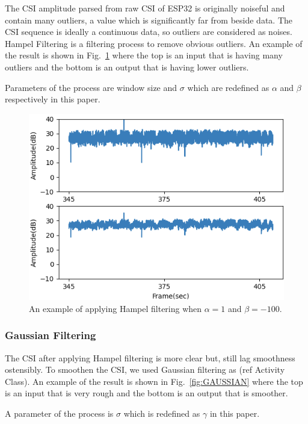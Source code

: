 \documentclass[10pt,letterpaper]{article}
\begin{document}
	The CSI amplitude parsed from raw CSI of ESP32 is originally noiseful and contain many outliers, a value which is significantly far from beside data. The CSI sequence is ideally a continuous data, so outliers are considered as noises.  Hampel Filtering is a filtering process to remove obvious outliers. An example of the result is shown in  Fig.~\ref{fig:HAMPEL} where the top is an input that is having many outliers and the bottom is an output that is having lower outliers.
	
		Parameters of the process are window size and $\sigma$ which are redefined as $\alpha$ and $\beta$ respectively in this paper.
		
		\begin{figure}[htbp]
		\centerline{\includegraphics[width=120mm,scale=0.9]{FILPD_R2H.png}}
		\caption{An example of applying Hampel filtering when $\alpha=1$ and $\beta=-100$.}
		\label{fig:HAMPEL}
	\end{figure}

	\subsubsection*{Gaussian Filtering}
	
	 The CSI after applying Hampel filtering is more clear but, still lag smoothness ostensibly. To smoothen the CSI, we used Gaussian filtering as (ref Activity Class).
	An example of the result is shown in  Fig.~\ref{fig:GAUSSIAN} where the top is an input that is very rough and the bottom is an output that is smoother.
	
	A parameter of the process is $\sigma$ which is redefined as $\gamma$ in this paper.
	
\end{document}
